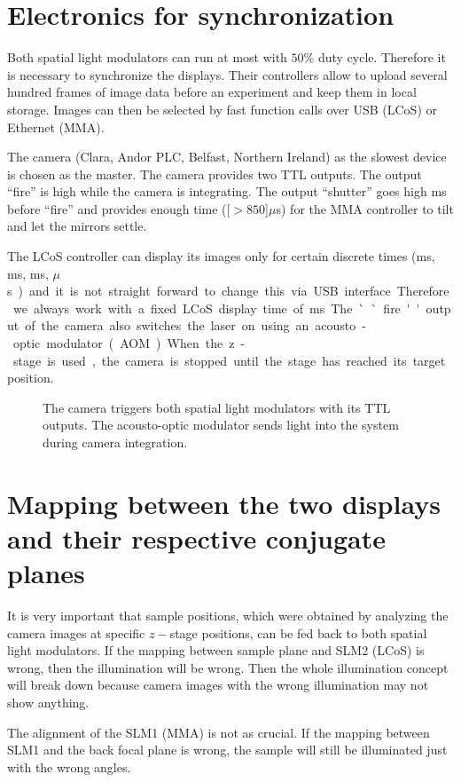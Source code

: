 \section{Electronics for synchronization}
Both spatial light modulators can run at most with $50\%$ duty
cycle. Therefore it is necessary to synchronize the displays. Their
controllers allow to upload several hundred frames of image data
before an experiment and keep them in local storage. Images can then
be selected by fast function calls over USB (LCoS) or Ethernet (MMA).

The camera (Clara, Andor PLC, Belfast, Northern Ireland) as the
slowest device is chosen as the master. The camera provides two TTL
outputs. The output ``fire'' is high while the camera is
integrating. The output ``shutter'' goes high \unit[1]{ms} before
``fire'' and provides enough time (\unit[$>850$]{$\mu$s}) for the MMA
controller to tilt and let the mirrors settle.

The LCoS controller can display its images only for certain discrete
times (\unit[20]{ms}, \unit[10]{ms}, \unit[5]{ms}, \unit[200]{$\mu$s})
and it is not straight forward to change this via USB
interface. Therefore we always work with a fixed LCoS display time of
\unit[20]{ms}. The ``fire'' output of the camera also switches the
laser on using an acousto-optic modulator (AOM).

When the z-stage is used, the camera is stopped until the stage has
reached its target position.

\begin{figure}[H]
  \centering
  
  \caption{The camera triggers both spatial light modulators with its
    TTL outputs. The acousto-optic modulator sends light into the
    system during camera integration.}
  \label{fig:memi-electronics}
\end{figure}

\section{Mapping between the two displays and their respective
  conjugate planes}
\begin{summary}
  It is very important that sample positions, which were obtained by
  analyzing the camera images at specific $z-$stage positions, can be
  fed back to both spatial light modulators. If the mapping between
  sample plane and SLM2 (LCoS) is wrong, then the illumination will be
  wrong. Then the whole illumination concept will break down because
  camera images with the wrong illumination may not show anything.

  The alignment of the SLM1 (MMA) is not as crucial. If the mapping
  between SLM1 and the back focal plane is wrong, the sample will
  still be illuminated just with the wrong angles.
\end{summary}

